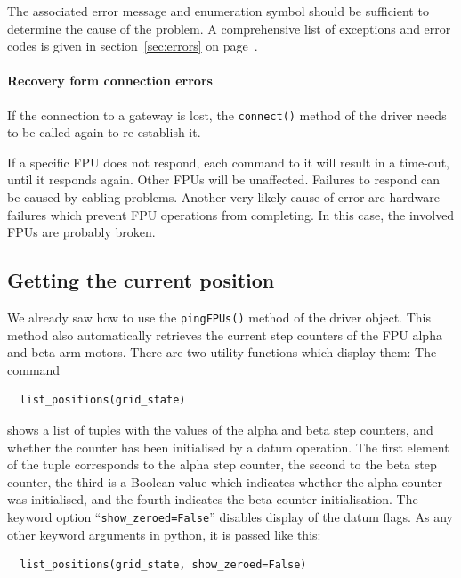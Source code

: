 \documentclass[11pt,a4paper]{scrartcl}
\begin{document}
The associated error message and enumeration symbol should be
sufficient to determine the cause of the problem. A comprehensive list
of exceptions and error codes is given in section~\ref{sec:errors} on
page~\pageref{sec:errors}.

\paragraph{Recovery form connection errors}
If the connection to a gateway is lost, the \texttt{connect()} method
of the driver needs to be called again to re-establish it.

If a specific FPU does not respond, each command to it will result in
a time-out, until it responds again. Other FPUs will be unaffected.
Failures to respond can be caused by cabling problems. Another very
likely cause of error are hardware failures which prevent FPU
operations from completing. In this case, the involved FPUs are
probably broken.



\subsection{Getting the current position}
   We already saw how to use
the \texttt{pingFPUs()} method of the driver object. This method also
automatically retrieves the current step counters of the FPU alpha and
beta arm motors.  There are two utility functions which display them:
The command

\begin{verbatim}
  list_positions(grid_state)
\end{verbatim}

shows a list of tuples with the values of the alpha and beta step
counters, and whether the counter has been initialised by a datum
operation. The first element of the tuple corresponds to the alpha
step counter, the second to the beta step counter, the third is a
Boolean value which indicates whether the alpha counter was
initialised, and the fourth indicates the beta counter
initialisation. The keyword option ``\texttt{show\_zeroed=False}''
disables display of the datum flags.  As any other keyword arguments
in python, it is passed like this:

\begin{verbatim}
  list_positions(grid_state, show_zeroed=False)
\end{verbatim}
\end{document}

